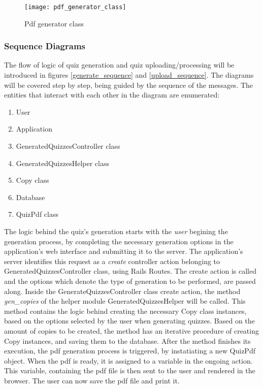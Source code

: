 \begin{figure}[!ht]
\centering
\texttt{[image: pdf\_generator\_class]}
\caption{Pdf generator class}\label{pdf_class}
\end{figure}

\subsubsection{Sequence Diagrams}
The flow of logic of quiz generation and quiz uploading/processing will be introduced in figures \ref{generate_sequence} and \ref{upload_sequence}. The diagrams will be covered step by step, being guided by the sequence of the messages. The entities that interact with each other in the diagram are enumerated:
\begin{enumerate} 
  \item User
  \item Application
  \item GeneratedQuizzesController class
  \item GeneratedQuizzesHelper class
  \item Copy class
  \item Database
  \item QuizPdf class
\end{enumerate}

The logic behind the quiz's generation starts with the \textit{user} begining the generation process, by completing the necessary generation options in the application's web interface and submitting it to the server. The application's server identifies this request as a \textit{create} controller action belonging to GeneratedQuizzesController class, using Rails Routes. The create action is called and the options which denote the type of generation to be performed, are passed along. Inside the GenerateQuizzesController class create action, the method \textit{gen\_copies} of the helper module GeneratedQuizzesHelper will be called. This method contains the logic behind creating the necessary Copy class instances, based on the options selected by the user when generating quizzes. Based on the amount of copies to be created, the method has an iterative procedure of creating Copy instances, and saving them to the database. After the method finishes its execution, the pdf generation process is triggered, by instatiating a new QuizPdf object. When the pdf is ready, it is assigned to a variable in the ongoing action. This variable, containing the pdf file is then sent to the user and rendered in the browser. The user can now save the pdf file and print it.

